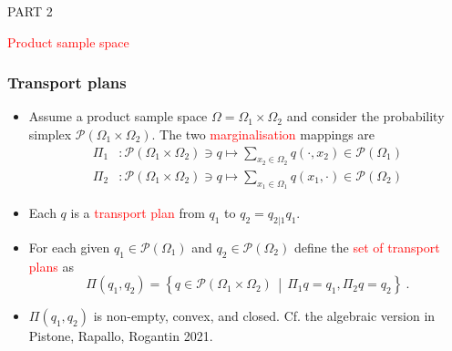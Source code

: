 \documentclass[xcolor=svgnames]{beamer}
\newcommand{\rosso}[1]{\textcolor{red}{#1}}
\newcommand{\setof}[2]{\left\{#1 \, \middle| \, #2 \right\}}
\newcommand{\simplexon}[1]{\mathcal P\left(#1\right)}
\renewcommand{\emph}{\rosso}
\begin{document}
\begin{frame}[plain]

    \huge PART 2

    \bigskip
\Large \emph{Product sample space}
    
\end{frame}



\begin{frame}[plain]\small\frametitle{Transport plans}
\begin{itemize}
    \item Assume a product sample space $\Omega = \Omega_1 \times \Omega_2$ and consider the probability simplex $\simplexon{\Omega_1 \times \Omega_2}$. The two \emph{marginalisation} mappings are
    \begin{align*}
 \Pi_1& \colon \simplexon{\Omega_1 \times \Omega_2} \ni q \mapsto \sum_{x_2 \in \Omega_2} q(\cdot,x_2) \in  \simplexon{\Omega_1}  \\
 \Pi_2& \colon \simplexon{\Omega_1 \times \Omega_2} \ni q \mapsto \sum_{x_1 \in \Omega_1} q(x_1,\cdot) \in  \simplexon{\Omega_2} 
    \end{align*}
    \item Each $q$ is a \emph{transport plan} from $q_1$ to $q_2 = q_{2|1} q_1$.
    \item For each given $q_1 \in \simplexon{\Omega_1}$ and $q_2 \in \simplexon{\Omega_2}$ define the \emph{set of transport plans} as 
    \begin{equation*}
        \Pi(q_1,q_2) = \setof{q \in \simplexon{\Omega_1 \times \Omega_2}} {\Pi_1 q = q_1, \Pi_2 q = q_2} \ .
    \end{equation*}
    \item $\Pi(q_1,q_2)$ is non-empty, convex, and closed. Cf. the algebraic version in Pistone, Rapallo, Rogantin 2021.
\end{itemize}    
\end{frame}
\end{document}
